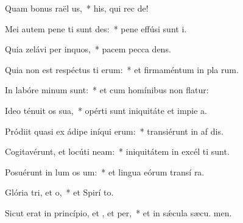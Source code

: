 \item Quam bonus raël us,~* his, qui rec  de!
\item Mei autem pene ti sunt des:~* pene effúsi sunt  i.
\item Quia zelávi per inquos,~* pacem pecca dens.
\item Quia non est respéctus ti erum:~* et firmaméntum in pla rum.
\item In labóre minum  sunt:~* et cum homínibus non flatur:
\item Ideo ténuit os sua,~* opérti sunt iniquitáte et impie a.
\item Pródiit quasi ex ádipe iníqui erum:~* transiérunt in af dis.
\item Cogitavérunt, et locúti  neam:~* iniquitátem in excél ti sunt.
\item Posuérunt in lum os um:~* et lingua eórum transí  ra.
\item Glória tri, et o,~* et Spirí to.
\item Sicut erat in princípio, et , et per,~* et in sǽcula sæcu. men.
